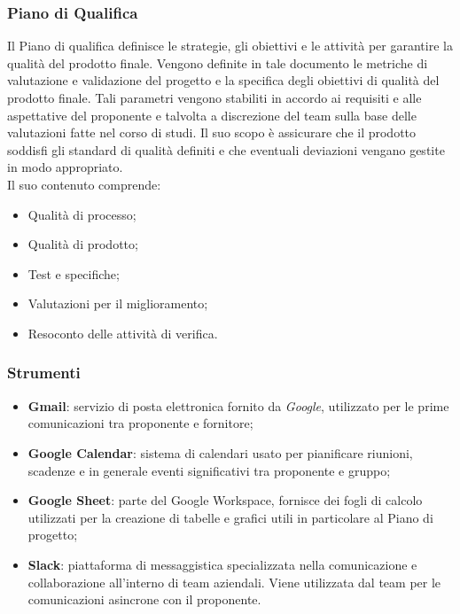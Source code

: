 \documentclass[10pt, a4paper]{article}
\begin{document}
\subsubsection{Piano di Qualifica}
Il Piano di qualifica definisce le strategie, gli obiettivi e le attività per garantire la qualità del prodotto finale. Vengono definite in 
tale documento le metriche di valutazione e validazione del progetto e la specifica degli obiettivi di qualità del prodotto finale. 
Tali parametri vengono stabiliti in accordo ai requisiti e alle aspettative del proponente e talvolta a discrezione del team sulla base 
delle valutazioni fatte nel corso di studi. Il suo scopo è assicurare che il prodotto soddisfi gli standard di qualità definiti e che 
eventuali deviazioni vengano gestite in modo appropriato.\\
Il suo contenuto comprende:
\begin{itemize}
    \item Qualità di processo;
    \item Qualità di prodotto;
    \item Test e specifiche;
    \item Valutazioni per il miglioramento;
    \item Resoconto delle attività di verifica.
\end{itemize}
\subsubsection{Strumenti}
\begin{itemize}
    \item {\textbf{Gmail}}: servizio di posta elettronica fornito da \textit{Google}, utilizzato per le prime comunicazioni tra proponente e fornitore;
    \item {\textbf{Google Calendar}}: sistema di calendari usato per pianificare riunioni, scadenze e in generale
    eventi significativi tra proponente e gruppo;
    \item {\textbf{Google Sheet}}: parte del Google Workspace, fornisce dei fogli di calcolo utilizzati per la creazione di tabelle e grafici utili in particolare al Piano di progetto;
    \item {\textbf{Slack}}: piattaforma di messaggistica specializzata nella comunicazione e collaborazione all’interno di team aziendali. Viene utilizzata dal team per le comunicazioni asincrone con il proponente.
\end{itemize}
\end{document}
